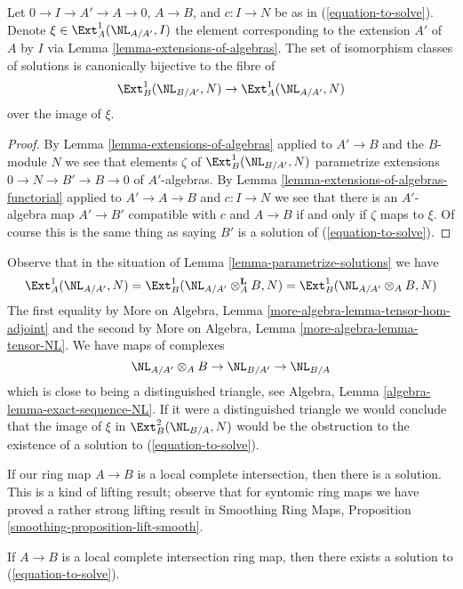 \begin{lemma}
\label{lemma-parametrize-solutions}
Let $0 \to I \to A' \to A \to 0$, $A \to B$, and $c : I \to N$ be as in
(\ref{equation-to-solve}). Denote $\xi \in \Ext^1_A(\NL_{A/A'}, I)$
the element corresponding to the extension $A'$ of $A$ by $I$ via
Lemma \ref{lemma-extensions-of-algebras}. The set of isomorphism
classes of solutions is canonically bijective to the fibre of
$$
\Ext^1_B(\NL_{B/A'}, N) \to \Ext^1_A(\NL_{A/A'}, N)
$$
over the image of $\xi$.
\end{lemma}

\begin{proof}
By Lemma \ref{lemma-extensions-of-algebras} applied to $A' \to B$ and
the $B$-module $N$ we see that elements $\zeta$ of $\Ext^1_B(\NL_{B/A'}, N)$
parametrize extensions $0 \to N \to B' \to B \to 0$ of $A'$-algebras.
By Lemma \ref{lemma-extensions-of-algebras-functorial} applied
to $A' \to A \to B$ and $c : I \to N$ we see that there is an $A'$-algebra
map $A' \to B'$ compatible with $c$ and $A \to B$ if and only if
$\zeta$ maps to $\xi$. Of course this is the same thing as saying $B'$ is a
solution of (\ref{equation-to-solve}).
\end{proof}

\begin{remark}
\label{remark-parametrize-solutions}
Observe that in the situation of Lemma \ref{lemma-parametrize-solutions}
we have
$$
\Ext^1_A(\NL_{A/A'}, N) =
\Ext^1_B(\NL_{A/A'} \otimes_A^\mathbf{L} B, N) =
\Ext^1_B(\NL_{A/A'} \otimes_A B, N)
$$
The first equality by
More on Algebra, Lemma \ref{more-algebra-lemma-tensor-hom-adjoint} and
the second by
More on Algebra, Lemma \ref{more-algebra-lemma-tensor-NL}.
We have maps of complexes
$$
\NL_{A/A'} \otimes_A B \to \NL_{B/A'} \to \NL_{B/A}
$$
which is close to being a distinguished triangle, see
Algebra, Lemma \ref{algebra-lemma-exact-sequence-NL}.
If it were a distinguished triangle we would conclude
that the image of $\xi$ in $\Ext^2_B(\NL_{B/A}, N)$
would be the obstruction to the existence of a solution to
(\ref{equation-to-solve}).
\end{remark}

\noindent
If our ring map $A \to B$ is a local complete intersection, then there
is a solution. This is a kind of lifting result; observe that
for syntomic ring maps we have proved a rather strong lifting result in
Smoothing Ring Maps, Proposition \ref{smoothing-proposition-lift-smooth}.

\begin{lemma}
\label{lemma-existence-lci}
If $A \to B$ is a local complete intersection ring map, then
there exists a solution to (\ref{equation-to-solve}).
\end{lemma}

